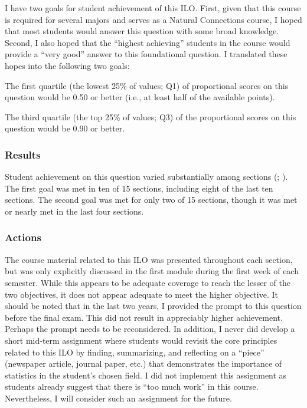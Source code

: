 \documentclass{article}\usepackage[]{graphicx}\usepackage[]{color}
\begin{document}
I have two goals for student achievement of this ILO. First, given that this course is required for several majors and serves as a Natural Connections course, I hoped that most students would answer this question with some broad knowledge. Second, I also hoped that the ``highest achieving'' students in the course would provide a ``very good'' answer to this foundational question. I translated these hopes into the following two goals:

\begin{Enumerate}
  \item The first quartile (the lowest 25\% of values; Q1) of proportional scores on this question would be 0.50 or better (i.e., at least half of the available points).
  \item The third quartile (the top 25\% of values; Q3) of the proportional scores on this question would be 0.90 or better.
\end{Enumerate}

\subsubsection{Results}
\vspace{-12pt}


Student achievement on this question varied substantially among sections (; ). The first goal was met in ten of 15 sections, including eight of the last ten sections. The second goal was met for only two of 15 sections, though it was met or nearly met in the last four sections.

\subsubsection{Actions}
\vspace{-12pt}
The course material related to this ILO was presented throughout each section, but was only explicitly discussed in the first module during the first week of each semester. While this appears to be adequate coverage to reach the lesser of the two objectives, it does not appear adequate to meet the higher objective. It should be noted that in the last two years, I provided the prompt to this question before the final exam. This did not result in appreciably higher achievement. Perhaps the prompt needs to be reconsidered. In addition, I never did develop a short mid-term assignment where students would revisit the core principles related to this ILO by finding, summarizing, and reflecting on a ``piece'' (newspaper article, journal paper, etc.) that demonstrates the importance of statistics in the student's chosen field. I did not implement this assignment as students already suggest that there is ``too much work'' in this course. Nevertheless, I will consider such an assignment for the future.
\vspace{12pt}
\end{document}
